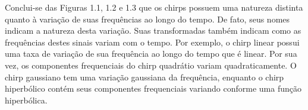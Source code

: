 \begin{figure}[ht!]
	\vspace{1mm}	%
	\begin{center}
	\end{center}
	\vspace{-1mm}	%
	\label{ex1_fig1}
\end{figure}


Conclui-se das Figuras 1.1, 1.2 e 1.3 que os chirps possuem uma natureza distinta quanto à variação de suas frequências ao longo do tempo. De fato, seus nomes indicam a natureza desta variação. Suas transformadas também indicam como as frequências destes sinais variam com o tempo. Por exemplo, o chirp linear possui uma taxa de variação de sua frequência ao longo do tempo que é linear. Por sua vez, os componentes frequenciais do chirp quadrátio variam quadraticamente. O chirp gaussiano tem uma variação gaussiana da frequência, enquanto o chirp hiperbólico contém seus componentes frequenciais variando conforme uma função hiperbólica.


